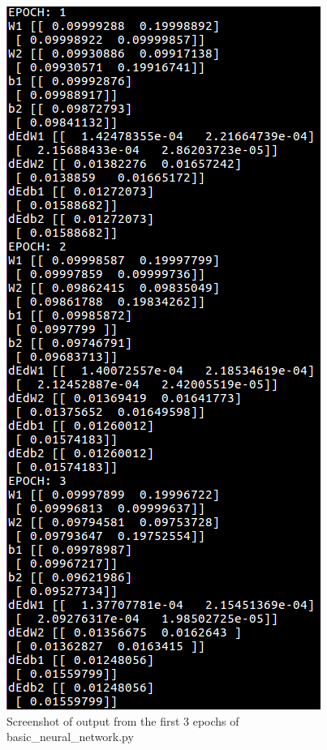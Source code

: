 \documentclass{article}
\begin{document}
\begin{figure}[!htb]
\centering
	\includegraphics[scale=0.52]{verify.png}
\caption{Screenshot of output from the first 3 epochs of basic\_neural\_network.py}
\end{figure}
\clearpage
\end{document}
